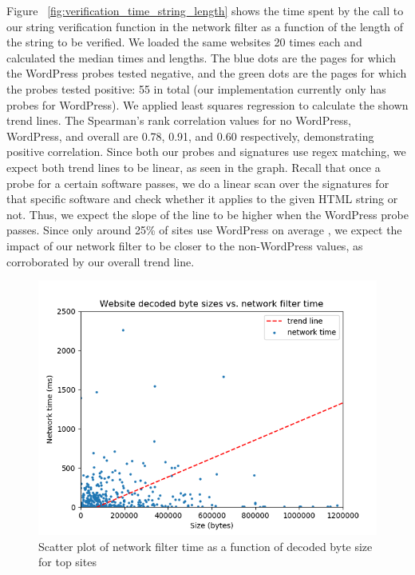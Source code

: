  Figure ~\ref{fig:verification_time_string_length} shows the time spent by the call to our string verification function in the network filter as a function of the length of the string to be verified. We loaded the same websites 20 times each and calculated the median times and lengths.  The blue dots are the pages for which the WordPress probes tested negative, and the green dots are the pages for which the probes tested positive: 55 in total (our implementation currently only has probes for WordPress). We applied least squares regression to calculate the shown trend lines. The Spearman's rank correlation values for no WordPress, WordPress, and overall are 0.78, 0.91, and 0.60 respectively, demonstrating positive correlation. Since both our probes and signatures use regex matching, we expect both trend lines to be linear, as seen in the graph. Recall that once a probe for a certain software passes, we do a linear scan over the signatures for that specific software and check whether it applies to the given HTML string or not. Thus, we expect the slope of the line to be higher when the WordPress probe passes. Since only around 25\% of sites use WordPress on average \cite{w3techs}, we expect the impact of our network filter to be closer to the non-WordPress values, as corroborated by our overall trend line.

\begin{figure}[h]
	\includegraphics[scale=0.5]{results/byte_size_vs_filter_time}
	\caption{Scatter plot of network filter time as a function of decoded byte size for top sites}
	\label{fig:network_filter_decoded_size}
\end{figure}

